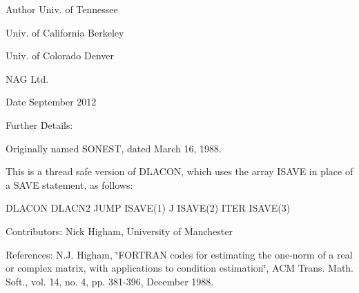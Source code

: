 \begin{DoxyAuthor}{Author}
Univ. of Tennessee 

Univ. of California Berkeley 

Univ. of Colorado Denver 

N\+A\+G Ltd. 
\end{DoxyAuthor}
\begin{DoxyDate}{Date}
September 2012 
\end{DoxyDate}
\begin{DoxyParagraph}{Further Details\+: }
\begin{DoxyVerb}  Originally named SONEST, dated March 16, 1988.

  This is a thread safe version of DLACON, which uses the array ISAVE
  in place of a SAVE statement, as follows:

     DLACON     DLACN2
      JUMP     ISAVE(1)
      J        ISAVE(2)
      ITER     ISAVE(3)\end{DoxyVerb}
 
\end{DoxyParagraph}
\begin{DoxyParagraph}{Contributors\+: }
Nick Higham, University of Manchester 
\end{DoxyParagraph}
\begin{DoxyParagraph}{References\+: }
N.\+J. Higham, \char`\"{}\+F\+O\+R\+T\+R\+A\+N codes for estimating the one-\/norm of
  a real or complex matrix, with applications to condition estimation\char`\"{}, A\+C\+M Trans. Math. Soft., vol. 14, no. 4, pp. 381-\/396, December 1988. 
\end{DoxyParagraph}
